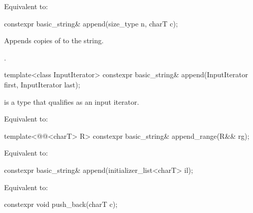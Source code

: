 \begin{itemdescr}
\pnum
\effects
Equivalent to: 
\end{itemdescr}

%
\begin{itemdecl}
constexpr basic_string& append(size_type n, charT c);
\end{itemdecl}

\begin{itemdescr}
\pnum
\effects
Appends  copies of  to the string.

\pnum
\returns
{}.
\end{itemdescr}

%
\begin{itemdecl}
template<class InputIterator>
  constexpr basic_string& append(InputIterator first, InputIterator last);
\end{itemdecl}

\begin{itemdescr}
\pnum
\constraints
{} is a type that qualifies as an input
iterator.

\pnum
\effects
Equivalent to: 
\end{itemdescr}

%
\begin{itemdecl}
template<@@<charT> R>
  constexpr basic_string& append_range(R&& rg);
\end{itemdecl}

\begin{itemdescr}
\pnum
\effects
Equivalent to: 
\end{itemdescr}

%
\begin{itemdecl}
constexpr basic_string& append(initializer_list<charT> il);
\end{itemdecl}

\begin{itemdescr}
\pnum
\effects
Equivalent to: 
\end{itemdescr}

%
\begin{itemdecl}
constexpr void push_back(charT c);
\end{itemdecl}

